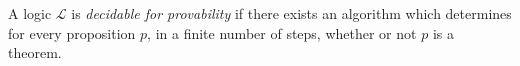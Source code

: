 A logic $\mathcal{L}$ is \emph{decidable for provability} if there exists an algorithm which determines for every proposition $p$, in a finite number of steps, whether or not $p$ is a theorem.
